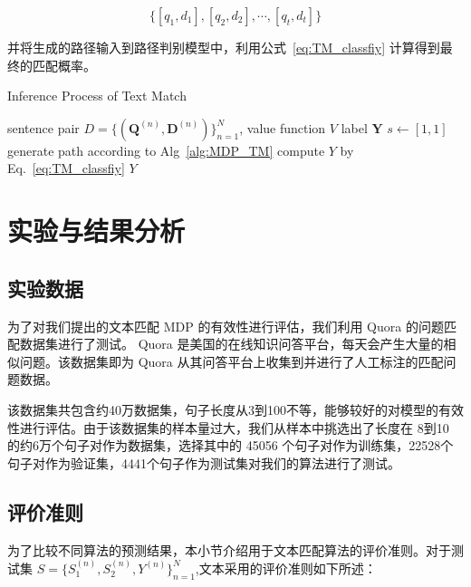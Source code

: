 $$\{[q_1, d_1], [q_2, d_2], \cdots, [q_t, d_t]\}$$

并将生成的路径输入到路径判别模型中，利用公式~\ref{eq:TM_classfiy} 计算得到最终的匹配概率。

\begin{algorithm}[!htbp]
    \small
    \caption{Inference Process of Text Match}\label{alg:TM_inf}
    \renewcommand{\algorithmicrequire}{\textbf{Input:}}
    \renewcommand{\algorithmicensure}{\textbf{Output:}}
    \begin{algorithmic}
        \Require sentence pair $D=\{ (\mathbf{Q}^{(n)}, \mathbf{D}^{(n)})\}_{n=1}^N$, value function $V$
        \Ensure label $\mathbf{Y}$
        \State $s \leftarrow [1,1]$
        \State generate path according to Alg~\ref{alg:MDP_TM}
        \State compute $Y$ by Eq.~\ref{eq:TM_classfiy}
        \State \Return  $Y$
    \end{algorithmic}
\end{algorithm}

\section{实验与结果分析}
\subsection{实验数据}
为了对我们提出的文本匹配 MDP 的有效性进行评估，我们利用 Quora 的问题匹配数据集进行了测试。 Quora 是美国的在线知识问答平台，每天会产生大量的相似问题。该数据集即为 Quora 从其问答平台上收集到并进行了人工标注的匹配问题数据。

该数据集共包含约40万数据集，句子长度从3到100不等，能够较好的对模型的有效性进行评估。由于该数据集的样本量过大，我们从样本中挑选出了长度在 8到10 的约6万个句子对作为数据集，选择其中的 45056 个句子对作为训练集，22528个句子对作为验证集，4441个句子作为测试集对我们的算法进行了测试。

\subsection{评价准则}
为了比较不同算法的预测结果，本小节介绍用于文本匹配算法的评价准则。对于测试集 $S = \{S_1^{(n)}, S_2^{(n)}, Y^{(n)}\}_{n=1}^N$,文本采用的评价准则如下所述：

